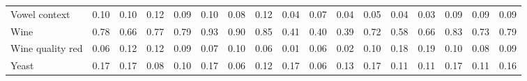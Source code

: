 \documentclass[preprint,12pt]{elsarticle}
\begin{document}
\begin{landscape}
\begin{table}[h!]
{\begin{tabular}{l c ccc ccc ccc ccc ccc}
Vowel context & 0.10 & 0.10 & 0.12 & 0.09 & 0.10 & 0.08 & 0.12 & 0.04 & 0.07 & 0.04 & 0.05 & 0.04 & 0.03 & 0.09 & 0.09 & 0.09 \\
Wine & 0.78 & 0.66 & 0.77 & 0.79 & 0.93 & 0.90 & 0.85 & 0.41 & 0.40 & 0.39 & 0.72 & 0.58 & 0.66 & 0.83 & 0.73 & 0.79 \\
Wine quality red & 0.06 & 0.12 & 0.12 & 0.09 & 0.07 & 0.10 & 0.06 & 0.01 & 0.06 & 0.02 & 0.10 & 0.18 & 0.19 & 0.10 & 0.08 & 0.09 \\
Yeast & 0.17 & 0.17 & 0.08 & 0.10 & 0.17 & 0.06 & 0.12 & 0.17 & 0.06 & 0.13 & 0.17 & 0.11 & 0.11 & 0.17 & 0.11 & 0.16 \\
\bottomrule
\end{tabular}
}
\end{table}
\end{landscape}


\end{document}
